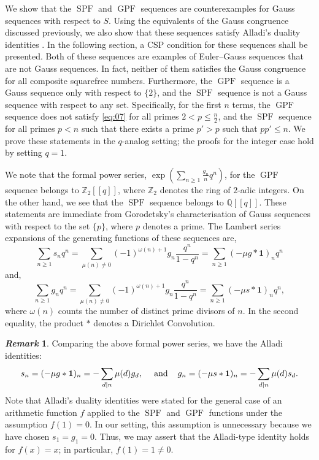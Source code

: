 \documentclass{article}
\numberwithin{equation}{section}
\theoremstyle{definition}
\newtheorem{remark}[definition]{\it Remark}
\begin{document}
We show that the $\operatorname{SPF}$ and $\operatorname{GPF}$ sequences are counterexamples for Gauss sequences with respect to
$S$. Using the equivalents of the Gauss congruence discussed previously, we also show that these sequences satisfy Alladi's duality identities \cite[Lemma 1]{gpfspf0}. In the following section, a CSP condition for these sequences shall be presented. Both of these sequences are examples of Euler–Gauss sequences that are not Gauss sequences. In fact, neither of them satisfies the Gauss congruence for all composite squarefree numbers. Furthermore, the $\operatorname{GPF}$ sequence is a Gauss sequence only with respect to $\{2\}$, and the $\operatorname{SPF}$ sequence is not a Gauss sequence with respect to any set. Specifically, for the first $n$ terms, the $\operatorname{GPF}$ sequence does not satisfy \eqref{eq:07} for all primes $2<p\leq\frac{n}{2}$, and the $\operatorname{SPF}$ sequence for all primes $p<n$ such that there exists a prime $p'>p$ such that $pp'\leq n$. We prove these statements in the $q$-analog setting; the proofs for the integer case hold by setting $q=1$.

We note that the formal power series,  $\exp\left(\sum_{n\geq1}\frac{g_n}{n}q^n\right)$, for the $\operatorname{GPF}$ sequence belongs to $\mathbb{Z}_2[[q]]$, where $\mathbb{Z}_2$ denotes the ring of $2$-adic integers. On the other hand, we see that the $\operatorname{SPF}$ sequence belongs to $\mathbb{Q}[[q]]$. These statements are immediate from Gorodetsky's characterisation of Gauss sequences with respect to the set $\{p\}$, where $p$ denotes a prime. The Lambert series expansions of the generating functions of these sequences are, 
\[
\sum_{n\geq1}s_nq^n=\sum_{\mu(n)\neq0}(-1)^{\omega(n)+1}g_n\frac{q^n}{1-q^n}=\sum_{n\geq1}(-\mu g*\mathbf{1})_nq^n
\]
and, 
\[
\sum_{n\geq1}g_nq^n=\sum_{\mu(n)\neq0}(-1)^{\omega(n)+1}g_n\frac{q^n}{1-q^n}=\sum_{n\geq1}(-\mu s*\mathbf{1})_nq^n,
\]
where $\omega(n)$ counts the number of distinct prime divisors of $n$. In the second equality, the product $*$ denotes a Dirichlet Convolution.  
 
\begin{remark}
    Comparing the above formal power series, we have the Alladi identities: 
\begin{equation}\label{eq:024}
    s_n=(-\mu g*\mathbf{1})_n =-\sum_{d|n}\mu(d)g_{d}\text{,\hspace{4mm} and\hspace{4mm}}g_n=(-\mu s*\mathbf{1})_n=-\sum_{d|n}\mu(d)s_{d}.
\end{equation}
Note that Alladi's duality identities \cite[Lemma 1]{gpfspf0} were stated for the general case of an arithmetic function $f$ applied to the $\operatorname{SPF}$ and $\operatorname{GPF}$ functions under the assumption $f(1)=0$. In our setting, this assumption is unnecessary because we have chosen $s_{1}=g_{1}=0$. Thus, we may assert that the Alladi-type identity holds for $f(x)=x$; in particular, $f(1)=1\neq 0$.
\end{remark}
\end{document}
